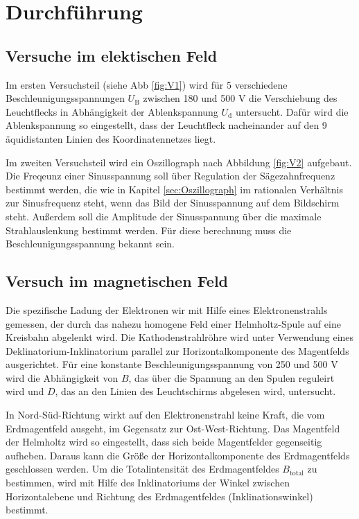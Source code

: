 \section{Durchführung}
\label{sec:Durchführung}

\subsection{Versuche im elektischen Feld}

Im ersten Versuchsteil (siehe Abb \ref{fig:V1}) wird für 5 verschiedene Beschleunigungsspannungen $U_\text{B}$ zwischen 180 und 500 V die Verschiebung des Leuchtflecks in Abhängigkeit der Ablenkspannung $U_\text{d}$ untersucht.
Dafür wird die Ablenkspannung so eingestellt, dass der Leuchtfleck nacheinander auf den 9 äquidistanten Linien des Koordinatennetzes liegt.

Im zweiten Versuchsteil wird ein Oszillograph nach Abbildung \ref{fig:V2} aufgebaut.
Die Freqeunz einer Sinusspannung soll über Regulation der Sägezahnfrequenz bestimmt werden, die wie in Kapitel \ref{sec:Oszillograph} im rationalen Verhältnis zur Sinusfrequenz steht, wenn das Bild der Sinusspannung auf dem Bildschirm steht.
Außerdem soll die Amplitude der Sinusspannung über die maximale Strahlauslenkung bestimmt werden.
Für diese berechnung muss die Beschleunigungsspannung bekannt sein.

\subsection{Versuch im magnetischen Feld}

Die spezifische Ladung der Elektronen wir mit Hilfe eines Elektronenstrahls gemessen, der durch das nahezu homogene Feld einer Helmholtz-Spule auf eine Kreisbahn abgelenkt wird.
Die Kathodenstrahlröhre wird unter Verwendung eines Deklinatorium-Inklinatorium parallel zur Horizontalkomponente des Magentfelds ausgerichtet.
Für eine konstante Beschleunigungsspannung von 250 und 500 V wird die Abhängigkeit von $B$, das über die Spannung an den Spulen reguleirt wird und $D$, das an den Linien des Leuchtschirms abgelesen wird, untersucht.

In Nord-Süd-Richtung wirkt auf den Elektronenstrahl keine Kraft, die vom Erdmagentfeld ausgeht, im Gegensatz zur Ost-West-Richtung.
Das Magentfeld der Helmholtz wird so eingestellt, dass sich beide Magentfelder gegenseitig aufheben.
Daraus kann die Größe der Horizontalkomponente des Erdmagentfelds geschlossen werden.
Um die Totalintensität des Erdmagentfeldes $B_\text{total}$ zu bestimmen, wird mit Hilfe des Inklinatoriums der Winkel zwischen Horizontalebene und Richtung des Erdmagentfeldes (Inklinationswinkel) bestimmt. 
